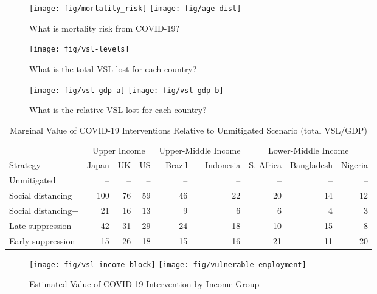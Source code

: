 \documentclass[11pt]{article}
\begin{document}
\clearpage


\begin{figure}[htbp!]
  \centering
  \caption{What is mortality risk from COVID-19?}
  \texttt{[image: fig/mortality\_risk]}
    \texttt{[image: fig/age-dist]}
  \label{fig:perc-mortality}
\end{figure}


\begin{figure}[htbp!]
  \centering
  \caption{What is the total VSL lost for each country?}
  \texttt{[image: fig/vsl-levels]}
  \label{fig:vsl-levels}
\end{figure}


\begin{figure}[htbp!]
  \centering
  \caption{What is the relative VSL lost for each country?}
  \texttt{[image: fig/vsl-gdp-a]}
  \texttt{[image: fig/vsl-gdp-b]}
  \label{fig:vsl-gdp}
\end{figure}

\begin{table}
\caption{\label{tab:marginal-value-intervention}Marginal Value of COVID-19 Interventions Relative to Unmitigated Scenario (total VSL/GDP)}
\centering
\begin{tabular}[t]{lrrrrrrrr}
\toprule
\multicolumn{1}{c}{ } & \multicolumn{3}{c}{Upper Income} & \multicolumn{2}{c}{Upper-Middle Income} & \multicolumn{3}{c}{Lower-Middle Income} \\
\cmidrule(l{3pt}r{3pt}){2-4} \cmidrule(l{3pt}r{3pt}){5-6} \cmidrule(l{3pt}r{3pt}){7-9}
Strategy & Japan & UK & US & Brazil & Indonesia & S. Africa & Bangladesh & Nigeria\\
\midrule
Unmitigated & -- & -- & -- & -- & -- & -- & -- & --\\
Social distancing & 100 & 76 & 59 & 46 & 22 & 20 & 14 & 12\\
Social distancing+ & 21 & 16 & 13 & 9 & 6 & 6 & 4 & 3\\
Late suppression & 42 & 31 & 29 & 24 & 18 & 10 & 15 & 8\\
Early suppression & 15 & 26 & 18 & 15 & 16 & 21 & 11 & 20\\
\bottomrule
\end{tabular}
\end{table}


\begin{figure}[htbp!]
\centering
\label{fig:vsl-employment-income}
\caption{Estimated Value of COVID-19 Intervention by Income Group}
\texttt{[image: fig/vsl-income-block]}
\texttt{[image: fig/vulnerable-employment]}
\end{figure}






\clearpage
\begin{singlespacing}

\printbibliography

\end{singlespacing}
\end{document}
